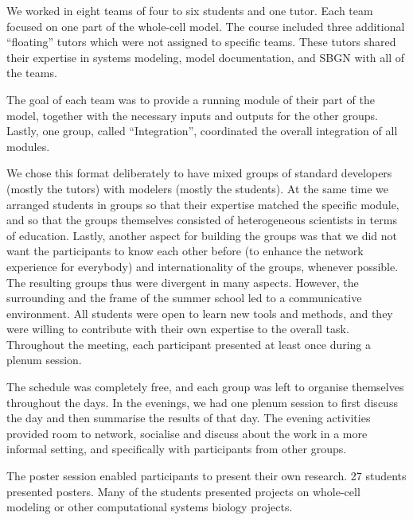 \documentclass[journal,transmag]{IEEEtran}
\newcommand{\comment}[3]{\pdfmarkupcomment[markup=Highlight,color=yellow,author={#2}]{#1}{#3}}
\begin{document}

We worked in eight teams of four to six students and one tutor. 
Each team focused on one part of the whole-cell model. 
The course included three additional ``floating'' tutors which were not assigned to specific teams. These tutors shared their expertise in systems modeling, model documentation, and SBGN with all of the teams.

The goal of each team was to provide a running module of their part of the model, together with the necessary inputs and outputs for the other groups. 
Lastly, one group, called ``Integration'', coordinated the overall integration of all modules.

We chose this format deliberately to have mixed groups of standard developers (mostly the tutors) with modelers (mostly the students). 
At the same time we arranged students in groups so that their expertise matched the specific module, and so that the groups themselves consisted of heterogeneous scientists in terms of education. Lastly, another aspect for building the groups was that we did not want the participants to know each other before (to enhance the network experience for everybody) and internationality of the groups, whenever possible. 
The resulting groups thus were divergent in many aspects. 
However, the surrounding and the frame of the summer school led to a communicative environment. 
All students were open to learn new tools and methods, and they were willing to contribute with their own expertise to the overall task.
Throughout the meeting, each participant presented at least once during a plenum session.

The schedule was completely free, and each group was left to organise themselves throughout the days.
In the evenings, we had one plenum session to first discuss the day and then summarise the results of that day. 
The evening activities provided room to network, socialise and discuss about the work in a more informal setting, and specifically with participants from other groups. 

The poster session enabled participants to present their own research. 
27 students presented posters. Many of the students presented projects on whole-cell modeling or other computational systems biology projects.
\end{document}
